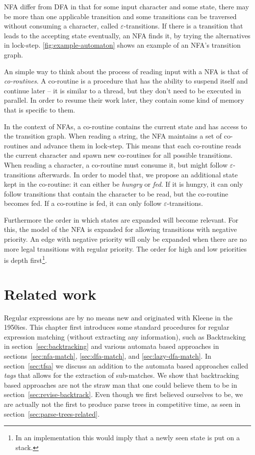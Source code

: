 \documentclass[11pt,a4paper,twoside,openright]{Thesis}
\theoremstyle{definition}
\newcommand{\Secref}[1]{section~\ref{sec:#1}}
\newcommand{\seclabel}[1]{\label{sec:#1}}
\begin{document}
NFA differ from DFA in that for some input character and some state, there
may be more than one applicable transition and some transitions can be
traversed without consuming a character, called $\varepsilon$-transitions.  If
there is a transition that leads to the accepting state eventually, an NFA
finds it, by trying the alternatives in lock-step.
\autoref{fig:example-automaton} shows an example of an NFA's transition graph.

An simple way to think about the process of reading input with a NFA is that 
of \emph{co-routines}. A co-routine is a procedure that has the ability to 
suspend itself and continue later -- it is similar to a thread, but they 
don't need to be executed in parallel. In order to resume their work later, 
they contain some kind of memory that is specific to them.

In the context of NFAs, a co-routine contains the current state and has access
to the transition graph. When reading a 
string, the NFA maintains a set of co-routines and advance them in 
lock-step. This means that each co-routine reads the current character and 
spawn new co-routines for all possible transitions. When reading a character, 
a co-routine must consume it, but might follow $\varepsilon$-transitions 
afterwards. In order to model that, we propose an additional state kept in 
the co-routine: it can either be \emph{hungry} or \emph{fed}. If it is 
hungry, it can only follow transitions that contain the character to be read, 
but the co-routine becomes fed. If a co-routine is fed, it can only 
follow $\varepsilon$-transitions.

Furthermore the order in which states are expanded will become relevant. For 
this, the model of the NFA is expanded for allowing transitions with negative 
priority. An edge with negative priority will only be expanded when there are 
no more legal transitions with regular priority. The order for high and low
priorities is depth first\footnote{In an implementation this would imply that 
a newly seen state is put on a stack.}.

\chapter{Related work}
\seclabel{related}
Regular expressions are by no means new and originated with Kleene in the 
1950ies\cite{Sips05a}. This chapter first introduces some standard 
procedures for regular expression matching (without extracting any
information), such as Backtracking in \Secref{backtracking} and various
automata based approaches in sections~\ref{sec:nfa-match}, \ref{sec:dfa-match},
and \ref{sec:lazy-dfa-match}. In \Secref{tfsa} we discuss an addition to 
the automata based approaches called \emph{tags} that allows for the extraction
of sub-matches. We show that backtracking based approaches are not the 
straw man that one could believe them to be in \Secref{revise-backtrack}.
Even though we first believed ourselves to be, we are actually not the first 
to produce parse trees in competitive time, as seen in \Secref{parse-trees-related}.
\end{document}
